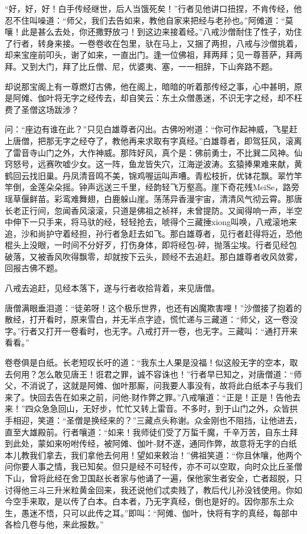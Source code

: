 \documentclass[12pt,UTF8]{ctexbook}
\begin{document}
{	“好，好，好！白手传经继世，后人当饿死矣！”行者见他讲口扭捏，不肯传经，他忍不住叫噪道：“师父，我们去告如来，教他自家来把经与老孙也。”阿傩道：“莫嚷！此是甚么去处，你还撒野放刁！到这边来接着经。”八戒沙僧耐住了性子，劝住了行者，转身来接。一卷卷收在包里，驮在马上，又捆了两担，八戒与沙僧挑着，却来宝座前叩头，谢了如来，一直出门。逢一位佛祖，拜两拜；见一尊菩萨，拜两拜。又到大门，拜了比丘僧、尼，优婆夷、塞，一一相辞，下山奔路不题。
	
	却说那宝阁上有一尊燃灯古佛，他在阁上，暗暗的听着那传经之事，心中甚明，原是阿傩、伽叶将无字之经传去，却自笑云：东土众僧愚迷，不识无字之经，却不枉费了圣僧这场跋涉？
	
	问：“座边有谁在此？”只见白雄尊者闪出。古佛吩咐道：“你可作起神威，飞星赶上唐僧，把那无字之经夺了，教他再来求取有字真经。”白雄尊者，即驾狂风，滚离了雷音寺山门之外，大作神威。那阵好风，真个是：佛前勇士，不比巽二风神。仙窍怒号，远赛吹嘘少女。这一阵，鱼龙皆失穴，江海逆波涛。玄猿捧果难来献，黄鹤回云找旧巢。丹凤清音鸣不美，锦鸡喔运叫声嘈。青松枝折，优钵花飘。翠竹竿竿倒，金莲朵朵摇。钟声远送三千里，经韵轻飞万壑高。崖下奇花残MeiSe，路旁瑶草偃鲜苗。彩鸾难舞翅，白鹿躲山崖。荡荡异香漫宇宙，清清风气彻云霄。那唐长老正行间，忽闻香风滚滚，只道是佛祖之祯祥，未曾提防。又闻得响一声，半空中伸下一只手来，将马驮的经，轻轻抢去，唬得个三藏捶xiong叫唤，八戒滚地来追，沙和尚护守着经担，孙行者急赶去如飞。那白雄尊者，见行者赶得将近，恐他棍头上没眼，一时间不分好歹，打伤身体，即将经包-碎，抛落尘埃。行者见经包破落，又被香风吹得飘零，却就按下云头，顾经不去追赶。那白雄尊者收风敛雾，回报古佛不题。
	
	八戒去追赶，见经本落下，遂与行者收拾背着，来见唐僧。
	
	唐僧满眼垂泪道：“徒弟呀！这个极乐世界，也还有凶魔欺害哩！”沙僧接了抱着的散经，打开看时，原来雪白，并无半点字迹，慌忙递与三藏道：“师父，这一卷没字。”行者又打开一卷看时，也无字。八戒打开一卷，也无字。三藏叫：“通打开来看看。”
	
	卷卷俱是白纸。长老短叹长吁的道：“我东土人果是没福！似这般无字的空本，取去何用？怎么敢见唐王！诳君之罪，诚不容诛也！”行者早已知之，对唐僧道：“师父，不消说了，这就是阿傩、伽叶那厮，问我要人事没有，故将此白纸本子与我们来了。快回去告在如来之前，问他-财作弊之罪。”八戒嚷道：“正是！正是！告他去来！”四众急急回山，无好步，忙忙又转上雷音。不多时，到于山门之外，众皆拱手相迎，笑道：“圣僧是换经来的？”三藏点头称谢。众金刚也不阻挡，让他进去，直至大雄殿前。行者嚷道：“如来！我师徒们受了万蜇千魔，千辛万苦，自东土拜到此处，蒙如来吩咐传经，被阿傩、伽叶-财不遂，通同作弊，故意将无字的白纸本儿教我们拿去，我们拿他去何用！望如来敕治！”佛祖笑道：“你且休嚷，他两个问你要人事之情，我已知矣。但只是经不可轻传，亦不可以空取，向时众比丘圣僧下山，曾将此经在舍卫国赵长者家与他诵了一遍，保他家生者安全，亡者超脱，只讨得他三斗三升米粒黄金回来，我还说他们忒卖贱了，教后代儿孙没钱使用。你如今空手来取，是以传了白本。白本者，乃无字真经，倒也是好的。因你那东土众生，愚迷不悟，只可以此传之耳。”即叫：“阿傩、伽叶，快将有字的真经，每部中各检几卷与他，来此报数。”
	
}
\end{document}
